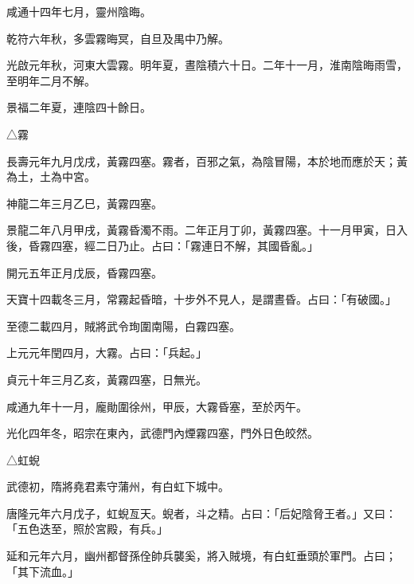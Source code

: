 \begin{pinyinscope}
 咸通十四年七月，靈州陰晦。



 乾符六年秋，多雲霧晦冥，自旦及禺中乃解。



 光啟元年秋，河東大雲霧。明年夏，晝陰積六十日。二年十一月，淮南陰晦雨雪，至明年二月不解。



 景福二年夏，連陰四十餘日。



 △霧



 長壽元年九月戊戌，黃霧四塞。霧者，百邪之氣，為陰冒陽，本於地而應於天；黃為土，土為中宮。



 神龍二年三月乙巳，黃霧四塞。



 景龍二年八月甲戌，黃霧昏濁不雨。二年正月丁卯，黃霧四塞。十一月甲寅，日入後，昏霧四塞，經二日乃止。占曰：「霧連日不解，其國昏亂。」



 開元五年正月戊辰，昏霧四塞。



 天寶十四載冬三月，常霧起昏暗，十步外不見人，是謂晝昏。占曰：「有破國。」



 至德二載四月，賊將武令珣圍南陽，白霧四塞。



 上元元年閏四月，大霧。占曰：「兵起。」



 貞元十年三月乙亥，黃霧四塞，日無光。



 咸通九年十一月，龐勛圍徐州，甲辰，大霧昏塞，至於丙午。



 光化四年冬，昭宗在東內，武德門內煙霧四塞，門外日色皎然。



 △虹蜺



 武德初，隋將堯君素守蒲州，有白虹下城中。



 唐隆元年六月戊子，虹蜺亙天。蜺者，斗之精。占曰：「后妃陰脅王者。」又曰：「五色迭至，照於宮殿，有兵。」



 延和元年六月，幽州都督孫佺帥兵襲奚，將入賊境，有白虹垂頭於軍門。占曰；「其下流血。」




\end{pinyinscope}
